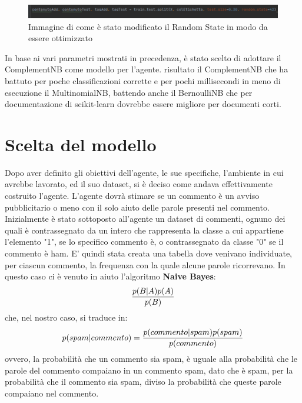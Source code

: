 \documentclass{report}
\begin{document}
    \begin{figure}[h]
            \centering
            \includegraphics[width =\textwidth]{immagini/randomState.png}
            \caption{Immagine di come è stato modificato il Random State in modo da essere ottimizzato}

    \end{figure}

                
    In base ai vari parametri mostrati in precedenza, è stato scelto di adottare il ComplementNB come modello per l'agente.
    risultato il ComplementNB che ha battuto per poche classificazioni corrette e per pochi millisecondi
        in meno di esecuzione il MultinomialNB, battendo anche il BernoulliNB che per documentazione 
        di scikit-learn dovrebbe essere migliore per documenti corti.

    
        \section{Scelta del modello}
    
        Dopo aver definito gli obiettivi dell'agente, le sue specifiche, l'ambiente in cui avrebbe lavorato, ed il suo dataset, si è deciso come andava effettivamente costruito l'agente.
        L'agente dovrà stimare se un commento è un avviso pubblicitario o meno con il solo aiuto delle parole presenti nel commento. Inizialmente è stato sottoposto all'agente 
        un dataset di commenti, ognuno dei quali è contrassegnato da un intero che rappresenta la classe a cui appartiene l'elemento "1", se lo specifico commento è, o contrassegnato da classe "0" se il commento è ham.
        E' quindi stata creata una tabella dove venivano individuate, per ciascun commento,
        la frequenza con la quale alcune parole ricorrevano. In questo caso ci è venuto in aiuto l'algoritmo {\bfseries Naive Bayes}:
        \newline
        \begin{equation}\label{bho}
            { p(B|A)  p(A)\over p(B)}
        \end{equation}
        \newline
        che, nel nostro caso, si traduce in:
        \newline
        \begin{equation}\label{bho2}
            p(spam|commento) = { p(commento|spam)  p(spam)\over p(commento)}
        \end{equation}
        \newline
        ovvero, la probabilità che un commento sia spam, è uguale alla probabilità che le parole del commento compaiano in un commento spam, dato che è spam, per la probabilità 
        che il commento sia spam, diviso la probabilità che queste parole compaiano nel commento.
    
\end{document}
